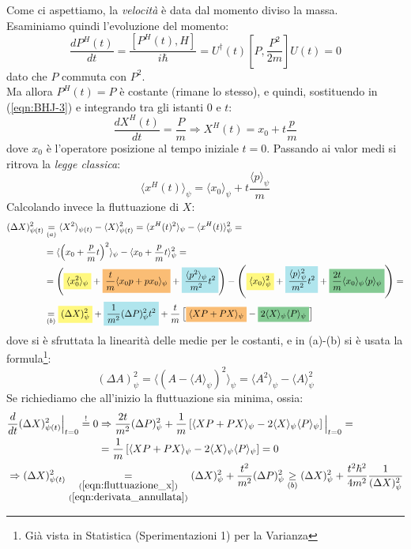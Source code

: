 \documentclass[../../FisicaTeorica.tex]{subfiles}
\begin{document}
Come ci aspettiamo, la \textit{velocità} è data dal momento diviso la massa.\\
Esaminiamo quindi l'evoluzione del momento:
\[
\frac{dP^H(t)}{dt}=\frac{[P^H(t),H]}{i\hbar}=U^\dag(t)\left[P,\frac{P^2}{2m}\right]U(t)=0
\]
dato che $P$ commuta con $P^2$.\\
Ma allora $P^H(t)=P$ è costante (rimane lo stesso), e quindi, sostituendo in (\ref{eqn:BHJ-3}) e integrando tra gli istanti $0$ e $t$:
\[
\frac{dX^H(t)}{dt}=\frac{P}{m}\Rightarrow X^H(t)=x_0+t\frac{p}{m}
\]
dove $x_0$ è l'operatore posizione al tempo iniziale $t=0$. Passando ai valor medi si ritrova la \textit{legge classica}:
\[
\langle x^H(t)\rangle_\psi = \langle x_0\rangle_\psi + t \frac{\langle p\rangle_\psi}{m}
\]
Calcolando invece la fluttuazione di $X$:
\begin{align}
\nonumber
(\Delta X)^2_{\psi(t)} &\underset{(a)}{=} \langle X^2\rangle_{\psi(t)}-\langle X\rangle_{\psi(t)}^2 =\langle x^H(t)^2\rangle_\psi-\langle x^H(t)\rangle_\psi^2 =\\
&=\langle \left(x_0+\frac{p}{m}t\right)^2\rangle_\psi-\langle x_0+\frac{p}{m}t\rangle^2_\psi =\nonumber \\
&= \nonumber
\left(
\hlc{Yellow}{\langle x_0^2\rangle_\psi} + \hlc{BurntOrange}{\frac{t}{m}\langle x_0p + px_0\rangle_\psi} 
+ \hlc{SkyBlue}{\frac{\langle p^2 \rangle_\psi}{m^2} t^2} \right)
-\left(
\hlc{Yellow}{\langle x_0\rangle_\psi^2} + \hlc{SkyBlue}{\frac{\langle p\rangle_\psi^2}{m^2}t^2} 
+ \hlc{ForestGreen}{\frac{2t}{m}\langle x_0\rangle_\psi\langle p\rangle_\psi}\right) =\\
&\underset{(b)}{=} \hlc{Yellow}{(\Delta X)^2_\psi} + \hlc{SkyBlue}{\frac{1}{m^2}(\Delta P)^2_\psi t^2} +
\frac{t}{m}\left [\hlc{BurntOrange}{\langle XP+PX\rangle_\psi}-\hlc{ForestGreen}{2\langle X\rangle_\psi\langle P\rangle_\psi}\right ]
\label{eqn:fluttuazione_x}
\end{align}
dove si è sfruttata la linearità delle medie per  le costanti, e in (a)-(b) si è usata la formula\footnote{Già vista in Statistica (Sperimentazioni 1) per la Varianza}:
\[
(\Delta A)^2_\psi = \langle(A-\langle A\rangle_\psi)^2\rangle_\psi =\langle A^2\rangle_\psi-\langle A\rangle_\psi^2
\]
Se richiediamo che all'inizio la fluttuazione sia minima, ossia:
\begin{align}
\frac{d}{dt}(\Delta X)^2_{\psi(t)}\Big|_{t=0}\overset{!}{=}0 &\Rightarrow 
\frac{2t}{m^2}(\Delta P)^2_\psi + \frac{1}{m}\left[
\langle XP + PX\rangle_\psi - 2\langle X\rangle_\psi \langle P\rangle_\psi
\right]\Big|_{t=0} =\nonumber \\
&= \frac{1}{m}\left[
\langle XP + PX\rangle_\psi - 2\langle X\rangle_\psi \langle P\rangle_\psi
\right] = 0
\label{eqn:derivata_annullata}
\\
\nonumber
\span \Rightarrow (\Delta X)^2_{\psi(t)} \underset{\substack{(\ref{eqn:fluttuazione_x})\\(\ref{eqn:derivata_annullata})}}{=} (\Delta X)^2_\psi + \frac{t^2}{m^2}(\Delta P)^2_\psi \underset{(b)}{\geq} (\Delta X)^2_\psi + \frac{t^2 \hbar^2}{4m^2} \frac{1}{(\Delta X)^2_\psi}
\end{align}
\end{document}
